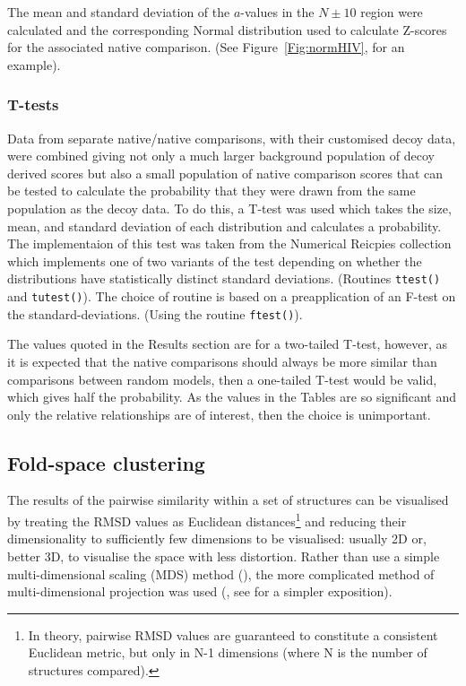 \documentclass{bmcart}
\newcommand{\Fig}[1]{Figure~\ref{Fig:#1}}
\begin{document}
The mean and standard deviation of the $a$-values in the $N\pm10$ region were calculated
and the corresponding Normal distribution used to calculate Z-scores for the associated
native comparison. (See \Fig{normHIV}, for an example).

\subsubsection*{T-tests}

Data from separate native/native comparisons, with their customised decoy data, were combined
giving not only a much larger background population of decoy derived scores but also a small
population of native comparison scores that can be tested to calculate the probability that
they were drawn from the same population as the decoy data.  To do this, a T-test was used which
takes the size, mean, and standard deviation of each distribution and calculates a probability.
The implementaion of this test was taken from the Numerical Reicpies collection \cite{PressWHet86}
which implements one of two variants of the test depending on whether the distributions
have statistically distinct standard deviations. (Routines {\tt ttest()} and {\tt tutest()}).
The choice of routine is based on a preapplication of an F-test on the standard-deviations.
(Using the routine {\tt ftest()}).

The values quoted in the Results section are for a two-tailed T-test, however, as it is expected
that the native comparisons should always be more similar than comparisons between random models,
then a one-tailed T-test would be valid, which gives half the probability.   As the values
in the Tables are so significant and only the relative relationships are of interest,
then the choice is unimportant.

\subsection*{Fold-space clustering}

The results of the pairwise similarity within a set of structures can be visualised by treating the
RMSD values as Euclidean distances\footnote{In theory, pairwise RMSD values are guaranteed to constitute
a consistent Euclidean metric, but only in N-1 dimensions (where N is the number of structures compared).
} and reducing their dimensionality to sufficiently few dimensions to be visualised: usually 2D or,
better 3D, to visualise the space with less distortion.
Rather than use a simple multi-dimensional scaling (MDS) method (\cite{BrownNPet96}), the more complicated
method of multi-dimensional projection was used (\cite{AszodiAet97a}, see \cite{TaylorWRet01b} for a
simpler exposition).
\end{document}
